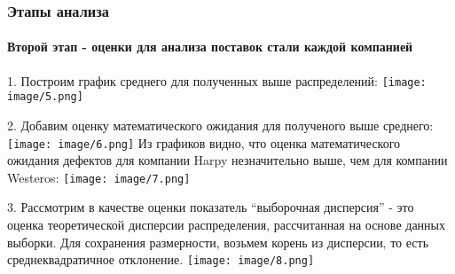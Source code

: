 ﻿\documentclass{beamer}
\begin{document}
\begin{frame}
\begin{flushleft}
\frametitle{Этапы анализа}
\framesubtitle{Второй этап - оценки для анализа поставок стали каждой компанией}
\footnotesize{1. Построим график среднего для полученных выше распределений:}
\texttt{[image: image/5.png]}
\end{flushleft}
\end{frame}

\begin{frame}
\begin{flushleft}
\footnotesize{2. Добавим оценку математического ожидания для полученого выше среднего:}
\texttt{[image: image/6.png]}
\newline
\tiny{Из графиков видно, что оценка математического ожидания дефектов для компании Harpy незначительно выше, чем для компании Westeros:}
\texttt{[image: image/7.png]}
\end{flushleft}
\end{frame}

\begin{frame}
\begin{flushleft}
\footnotesize{3. Рассмотрим в качестве оценки показатель “выборочная дисперсия” - это оценка теоретической дисперсии распределения, рассчитанная на основе данных выборки. Для сохранения размерности, возьмем корень из дисперсии, то есть среднеквадратичное отклонение.}
\texttt{[image: image/8.png]}
\end{flushleft}
\end{frame}
\end{document}
